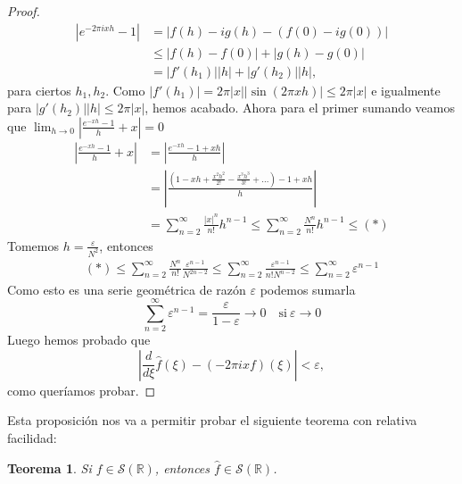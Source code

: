\documentclass[12pt]{article}
\newcommand{\Sc}{\mathcal{S}(\mathbb{R})}
\theoremstyle{plain}
\newtheorem{teorema}{Teorema}[section] %
\theoremstyle{definition}
\numberwithin{equation}{section}
\begin{document}
\begin{proof}
                \begin{align*}
                    \left\lvert e^{-2\pi i x h} - 1 \right\rvert &= \left\lvert f(h) - i g(h) - (f(0) - i g(0)) \right\rvert \\
                    &\le \lvert f(h) - f(0) \rvert + \lvert g(h) - g(0) \rvert \\
                    &= \lvert f'(h_1) \rvert \lvert h \rvert + \lvert g'(h_2) \rvert \lvert h \rvert,
                \end{align*}
                para ciertos \(h_1,h_2\). Como \(\lvert f'(h_1) \rvert = 2\pi \left\lvert x\right\rvert \left\lvert \sin (2\pi xh)\right\rvert \le 2\pi \left\lvert x\right\rvert\) e igualmente para \(\lvert g'(h_2) \rvert \lvert h \rvert\le 2\pi \left\lvert x\right\rvert\), hemos acabado.
                Ahora para el primer sumando veamos que \(\lim_{h \to 0}  \left\lvert \frac{e^{-x h} - 1}{h} + x\right\rvert = 0\)
                \begin{align*}
                    \left\lvert \frac{e^{-xh} - 1}{h} + x \right\rvert &= \left\lvert \frac{e^{-xh} - 1 + xh}{h} \right\rvert \\[2mm]
                    &= \left\lvert \frac{\left(1 - xh + \frac{x^2 h^2}{2!} - \frac{x^3 h^3}{3!} + \dots \right) - 1 + xh}{h} \right\rvert \\[2mm]
                    &= \sum_{n=2}^{\infty} \frac{\lvert x \rvert^n}{n!} h^{n-1} \le \sum_{n=2}^{\infty} \frac{N^n}{n!} h^{n-1} \le (\ast) 
                \end{align*}
                Tomemos \(h = \frac{\varepsilon}{N^2}\), entonces
                \begin{align*}
                    (\ast)  \le \sum_{n=2}^{\infty} \frac{N^n}{n!} \frac{\varepsilon^{n-1}}{N^{2n-2}} \le \sum_{n=2}^{\infty} \frac{\varepsilon^{n-1}}{n!N^{n-2}} \le \sum_{n=2}^{\infty} \varepsilon^{n-1}
                \end{align*}
                Como esto es una serie geométrica de razón \(\varepsilon\) podemos sumarla $$ \sum_{n=2}^{\infty} \varepsilon^{n-1} = \frac{\varepsilon}{1-\varepsilon} \to 0 \quad \text{si}\ \varepsilon \to 0 $$
                Luego hemos probado que
                $$ \left\lvert \frac{d}{d\xi}\hat{f}(\xi) - \widehat{(-2\pi i x f)}(\xi) \right\rvert < \varepsilon, $$ 
                como queríamos probar.
           \end{proof}
           Esta proposición nos va a permitir probar el siguiente teorema con relativa facilidad:
           \begin{teorema}
               \label{theorem13}
               Si \(f \in \Sc\), entonces \(\hat{f} \in \Sc\).
           \end{teorema}
\end{document}
